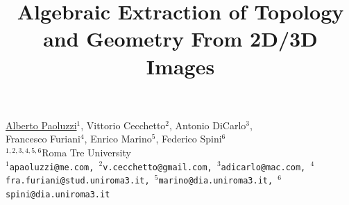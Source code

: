 \documentclass[article, A4, 11pt]{llncs}%
\begin{document}
\title{Algebraic Extraction of Topology and Geometry From 2D/3D Images}
 \author{} \institute{}
\maketitle
\begin{center}
{\large \underline{Alberto Paoluzzi}$^1$, Vittorio Cecchetto$^2$, Antonio DiCarlo$^3$,\\  Francesco Furiani$^4$, Enrico Marino$^5$, Federico Spini$^6$}\\
\vspace{4mm}
$^{1,2,3,4,5,6}$Roma Tre University\\
\vspace{4mm}
{\tt$^1$apaoluzzi@me.com, $^2$v.cecchetto@gmail.com, $^3$adicarlo@mac.com,  $^4$fra.furiani@stud.uniroma3.it, $^5$marino@dia.uniroma3.it, $^6$spini@dia.uniroma3.it}

\end{center}
\end{document}
